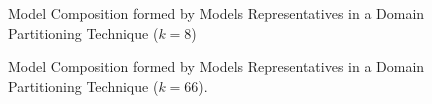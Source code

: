 \begin{figure}[ht]
{\begin{minipage}[c][1\width]{
				0.5\textwidth}
	\end{minipage}}
	\caption{Model Composition formed by Models Representatives in a Domain Partitioning Technique ($k=8$)}
	\label{Fig:query_10x10_kmedoids_regular_k8}
\end{figure}

\begin{figure}[h!]
	\hfill 	
	\caption{Model Composition formed by Models Representatives in a Domain Partitioning Technique ($k=66$).}
	\label{Fig:query_10x10_kmedoids_regular_k66}
\end{figure}

